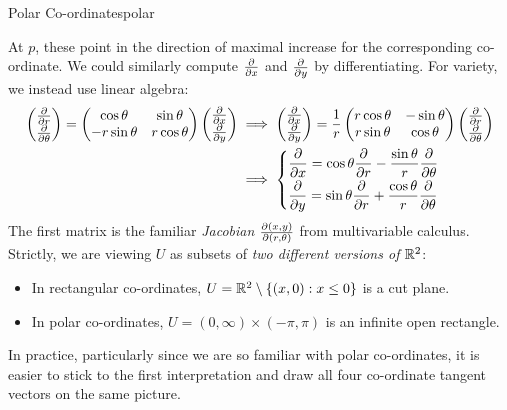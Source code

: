 \begin{example}{Polar Co-ordinates}{polar}
\begin{minipage}[t]{0.39\linewidth}
	\end{minipage}
	\bigbreak
	At $p$, these point in the direction of maximal increase for the corresponding co-ordinate.\smallbreak
	We could similarly compute $\partials x$ and $\partials y$ by differentiating. For variety, we instead use linear algebra:
	\begin{align*}
		\twovec{\partials r}{\partials\theta}
		=
		\begin{pmatrix}
			\cos\theta&\sin\theta\\
			-r\sin\theta&r\cos\theta
		\end{pmatrix}
		\twovec{\partials x}{\partials y}
		&\implies
		\twovec{\partials x}{\partials y}
		=
		\frac 1r
		\begin{pmatrix}
			r\cos\theta&-\sin\theta\\
			r\sin\theta&\cos\theta
		\end{pmatrix}
		\twovec{\partials r}{\partials\theta}\\
		&\implies
		\begin{cases}
			\displaystyle \partials x=\cos\theta\partials r-\frac{\sin\theta}r\partials\theta\\[5pt]
			\displaystyle \partials y=\sin\theta\partials r+\frac{\cos\theta}r\partials\theta
		\end{cases}
	\end{align*}
	The first matrix is the familiar \emph{Jacobian} $\partials[(x,y)]{(r,\theta)}$ from multivariable calculus.
	Strictly, we are viewing $U$ as subsets of \emph{two different versions of $\R^2$}:
	\begin{itemize}
	  \item In rectangular co-ordinates, $U=\R^2\setminus\{(x,0):x\le 0\}$ is a cut plane.
	  \item In polar co-ordinates, $U=(0,\infty)\times(-\pi,\pi)$ is an infinite open rectangle.
	\end{itemize}
	In practice, particularly since we are so familiar with polar co-ordinates, it is easier to stick to the first interpretation and draw all four co-ordinate tangent vectors on the same picture.
\end{example}


\clearpage


